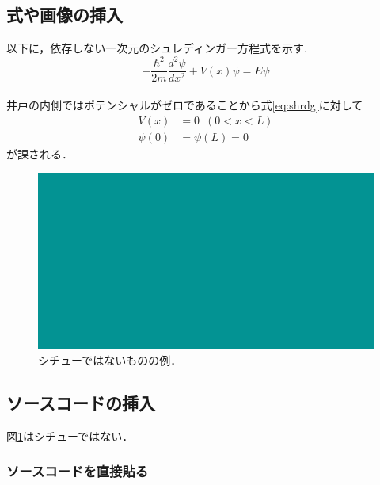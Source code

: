 
\subsection{式や画像の挿入}

以下に，依存しない一次元のシュレディンガー方程式を示す.\\
\begin{equation} \label{eq:shrdg}
  - \frac{\hbar^2 }{{2m}}\frac{{{d^2}\psi }}{{d{x^2}}} + V(x)\psi  = E\psi
\end{equation}\\

井戸の内側ではポテンシャルがゼロであることから式\eqref{eq:shrdg}に対して
\begin{align} \label{eq:poten0}
  V(x)      &= 0\,\,\,(0 < x < L) \\
  \psi(0)   &= \psi (L) = 0
\end{align}
が課される．\\

\begin{figure}[H]
  \centering
  \includegraphics[keepaspectratio=true, scale=0.5]{test.png}
  \caption{シチューではないものの例．}
  \label{fig:test}
\end{figure}



\subsection{ソースコードの挿入}

図\ref{fig:test}はシチューではない．\\

\subsubsection{ソースコードを直接貼る}

